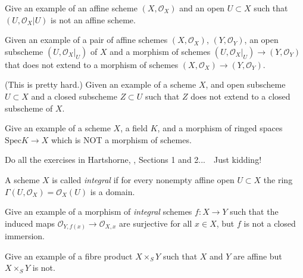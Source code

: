 \begin{exercise}
\label{exercise-open-affine-not-affine}
Give an example of an affine scheme $(X, {\mathcal O}_X)$
and an open $U \subset X$ such that $(U, {\mathcal O}_X|U)$ is not an affine
scheme.
\end{exercise}

\begin{exercise}
\label{exercise-morphism-does-not-extend}
Given an example of a pair of affine schemes
$(X, {\mathcal O}_X)$, $(Y, {\mathcal O}_Y)$,
an open subscheme $(U, {\mathcal O}_X|_U)$
of $X$ and a morphism of schemes
$(U, {\mathcal O}_X|_U) \to (Y, {\mathcal O}_Y)$
that does not extend to a morphism of schemes
$(X, {\mathcal O}_X) \to (Y, {\mathcal O}_Y)$.
\end{exercise}

\begin{exercise}
\label{exercise-closed-subscheme-does-not-extend}
(This is pretty hard.)
Given an example of a scheme $X$, and open subscheme $U \subset X$
and a closed subscheme $Z \subset U$ such that $Z$ does not extend
to a closed subscheme of $X$. 
\end{exercise}

\begin{exercise}
\label{exercise-not-morphism-schemes}
Give an example of a scheme $X$, a field $K$, and a
morphism of ringed spaces $\text{Spec} K \to X$ which
is NOT a morphism of schemes.
\end{exercise}

\begin{exercise}
\label{exercise-just-kidding}
Do all the exercises in Hartshorne, \cite[Chapter II]{H},
Sections 1 and 2...\ \ Just kidding!
\end{exercise}

\begin{definition}
A scheme $X$ is called {\it integral} if for every nonempty affine
open $U \subset X$ the ring $\Gamma(U, \mathcal{O}_X) = \mathcal{O}_X(U)$
is a domain.
\end{definition}

\begin{exercise}
\label{exercise-morphism-integral-schemes-surjective-stalks-not-closed}
Give an example of a morphism of {\it integral}
schemes $f : X \to Y$ such that the induced maps ${\mathcal O}_{Y,f(x)}
\to {\mathcal O}_{X,x}$ are surjective for all $x\in X$, but $f$
is not a closed immersion.
\end{exercise}

\begin{exercise}
\label{exercise-fibre-product-affines-not-affine}
Give an example of a fibre product $X\times_S Y$ such that $X$ and $Y$
are affine but $X\times_S Y$ is not.
\end{exercise}

